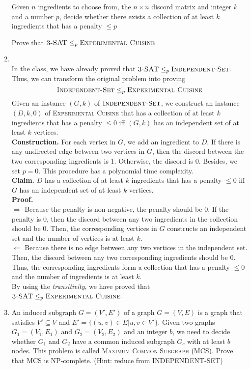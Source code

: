 \documentclass[12pt,a4paper]{article}
\makeatletter
\newtheorem*{solution}{Solution}
\theoremstyle{definition}
\renewenvironment{solution}[1][Solution] {\par\pushQED{\qed}\normalfont\topsep6\p@\@plus6\p@\relax\trivlist\item[\hskip\labelsep\bfseries#1\@addpunct{.}]\ignorespaces}{\popQED\endtrivlist\@endpefalse} \makeatother
\makeatother
\begin{document}
\begin{enumerate}
        Given $n$ ingredients to choose from, the $n\times n$ discord matrix and integer $k$ and a number $p$,  decide whether there exists a collection of at least $k$ ingredients that has a penalty $\leqslant p$

    Prove that $\textsc{3-SAT}\leq_p\textsc{Experimental Cuisine}$
    
    \begin{solution}
    ~\\
    In the class, we have already proved that $\textsc{3-SAT}\leq_p\textsc{Independent-Set}$. Thus, we can transform the original problem into proving $$\textsc{Independent-Set}\leq_p\textsc{Experimental Cuisine}$$
    Given an instance $(G,k)$ of $\textsc{Independent-Set}$, we construct an instance $(D,k,0)$ of \textsc{Experimental Cuisine} that has a collection of at least $k$ ingredients that has a penalty $\le 0$ iff $(G,k)$ has an independent set of at least $k$ vertices.\\
    \textbf{Construction.} For each vertex in $G$, we add an ingredient to $D$. If there is any undirected edge between two vertices in $G$, then the discord between the two corresponding ingredients is 1. Otherwise, the discord is 0. Besides, we set $p=0$. This procedure has a polynomial time complexity.\\
    \textbf{Claim.} $D$ has a collection of at least $k$ ingredients that has a penalty $\le 0$ iff $G$ has an independent set of at least $k$ vertices.\\
    \textbf{Proof.}\\
    $\Longrightarrow$ Because the penalty is non-negative, the penalty should be 0. If the penalty is 0, then the discord between any two ingredients in the collection should be 0. Then, the corresponding vertices in $G$ constructs an independent set and the number of vertices is at least $k$.\\
    $\Longleftarrow$ Because there is no edge between any two vertices in the independent set. Then, the discord between any two corresponding ingredients should be 0. Thus, the corresponding ingredients form a collection that has a penalty $\le 0$ and the number of ingredients is at least $k$.\\
    By using the \emph{transitivity}, we have proved that $\textsc{3-SAT}\leq_p\textsc{Experimental Cuisine}$.
    \end{solution}
    
    \item An induced subgraph $G=(V',E')$ of a graph $G=(V,E)$ is a graph that satisfies $V'\subseteq V$ and $E' =\{(u,v)\in E| u,v\in V'\}$. Given two graphs $G_1=(V_1,E_1)$ and $G_2=(V_2,E_2)$ and an integer $b$, we need to decide whether $G_1$ and $G_2$ have a common induced subgraph $G_c$ with at least $b$ nodes. This problem is called \textsc{Maximum Common Subgraph} (MCS). Prove that MCS is NP-complete. (Hint: reduce from \textsc{INDEPENDENT-SET})
    

\end{enumerate}
\end{document}
